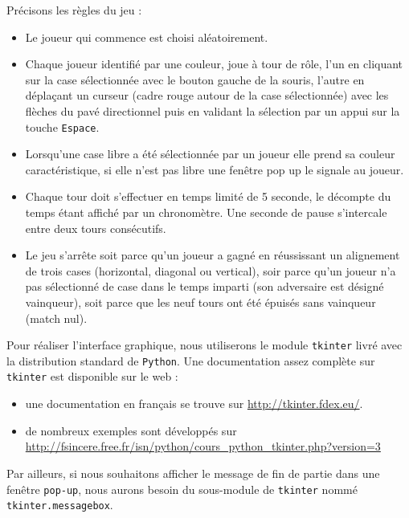 \documentclass[a4paper, french, 12pt]{article}  %
\newcounter{act}
\begin{document}
Précisons les règles du jeu :
{\itshape
\begin{itemize}[label=]
\item Le joueur qui commence est choisi aléatoirement.
\item Chaque joueur identifié par une couleur, joue à tour de rôle, l'un en cliquant sur la case sélectionnée avec le bouton gauche de la souris, l'autre en déplaçant un curseur (cadre rouge autour de la case sélectionnée) avec les flèches du pavé directionnel puis en validant la sélection par un appui sur la touche \texttt{Espace}.  

\item Lorsqu'une case libre a été sélectionnée par un joueur elle prend sa couleur caractéristique, si elle n'est pas libre une fenêtre pop up le signale au joueur.

\item Chaque tour doit s'effectuer en temps limité de 5 seconde, le décompte du temps étant affiché par un chronomètre. Une seconde de pause s'intercale entre deux tours consécutifs.

\item Le jeu s'arrête soit parce qu'un joueur a gagné en  réussissant un alignement de trois cases (horizontal, diagonal ou vertical), soir parce qu'un joueur n'a pas sélectionné de case dans le temps imparti (son adversaire est désigné vainqueur), soit parce que les neuf tours ont été épuisés sans vainqueur (match nul).
\end{itemize}

}

Pour réaliser l'interface graphique, nous utiliserons le module \lstinline+tkinter+ livré avec la distribution standard de \texttt{Python}. Une documentation assez complète sur \lstinline+tkinter+ est disponible sur le web  :

\begin{itemize}[label=]

	\item une documentation en français se trouve sur  \url{http://tkinter.fdex.eu/}.
	
	\item de nombreux exemples sont développés sur \url{http://fsincere.free.fr/isn/python/cours_python_tkinter.php?version=3}
	
\end{itemize}

Par ailleurs, si nous souhaitons afficher  le message de fin de partie dans une fenêtre \texttt{pop-up}, nous aurons besoin du sous-module de \lstinline+tkinter+  nommé \lstinline+tkinter.messagebox+.
\end{document}
